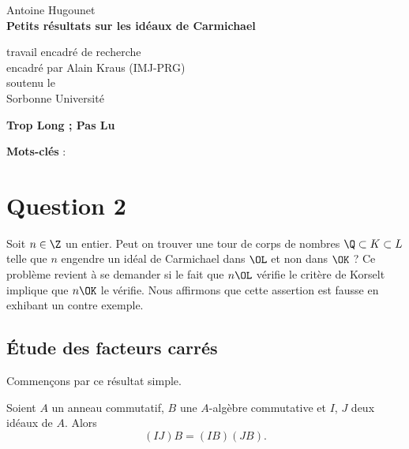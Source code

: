 \documentclass[a4paper, 12pt, oneside]{article}
\begin{document}
\begin{titlepage}
\begin{center}
	\large Antoine Hugounet \\

	\vspace{40px}
	\LARGE \textbf{Petits résultats sur les idéaux de Carmichael}

	\vspace{40px}
	\large
	travail encadré de recherche \\
	encadré par Alain Kraus (IMJ-PRG) \\
	soutenu le  \\

	\vspace{20px}
	Sorbonne Université
\end{center}

\normalsize
\vspace{80px}
\begin{center} \textbf{Trop Long ; Pas Lu} \end{center}
\vspace{-1em}

\vfill
\begin{center}
	\normalsize \textbf{Mots-clés} : \textit{}
\end{center}
\end{titlepage}

\section{Question 2}

Soit $n\in \Z$ un entier. Peut on trouver une tour de corps de nombres $\Q \subset K \subset L$ telle que $n$ engendre un idéal de Carmichael dans $\OL$ et non dans $\OK$ ? Ce problème revient à se demander si le fait que $n\OL$ vérifie le critère de Korselt implique que $n\OK$ le vérifie. Nous affirmons que cette assertion est fausse en exhibant un contre exemple.

\subsection{Étude des facteurs carrés}

Commençons par ce résultat simple.

\begin{fait}Soient $A$ un anneau commutatif, $B$ une $A$-algèbre commutative et $I$, $J$ deux idéaux de $A$. Alors $$(IJ) B = (IB)(JB).$$
\end{fait}
\end{document}
